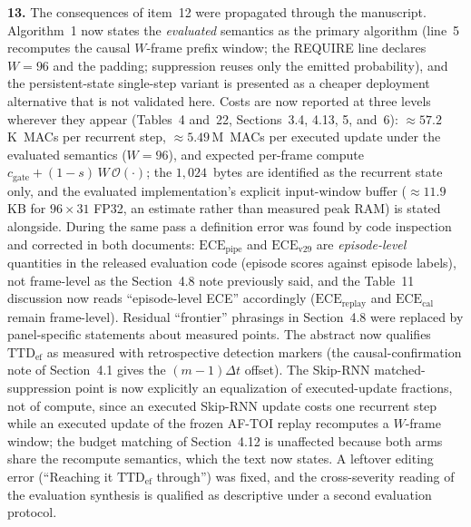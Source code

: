 \documentclass[1p,12pt,authoryear]{elsarticle}
\begin{document}
\vspace{2mm}
\noindent \textbf{13.} The consequences of item~12 were propagated through the manuscript. Algorithm~1 now states the \emph{evaluated} semantics as the primary algorithm (line~5 recomputes the causal $W$-frame prefix window; the REQUIRE line declares $W{=}96$ and the padding; suppression reuses only the emitted probability), and the persistent-state single-step variant is presented as a cheaper deployment alternative that is not validated here. Costs are now reported at three levels wherever they appear (Tables~4 and~22, Sections~3.4, 4.13, 5, and~6): ${\approx}57.2$\,K~MACs per recurrent step, ${\approx}5.49$\,M~MACs per executed update under the evaluated semantics ($W{=}96$), and expected per-frame compute $c_{\mathrm{gate}}+(1-s)\,W\,\mathcal{O}(\cdot)$; the $1{,}024$~bytes are identified as the recurrent state only, and the evaluated implementation's explicit input-window buffer (${\approx}11.9$\,KB for $96\times31$ FP32, an estimate rather than measured peak RAM) is stated alongside. During the same pass a definition error was found by code inspection and corrected in both documents: $\mathrm{ECE}_{\mathrm{pipe}}$ and $\mathrm{ECE}_{\mathrm{v29}}$ are \emph{episode-level} quantities in the released evaluation code (episode scores against episode labels), not frame-level as the Section~4.8 note previously said, and the Table~11 discussion now reads ``episode-level ECE'' accordingly ($\mathrm{ECE}_{\mathrm{replay}}$ and $\mathrm{ECE}_{\mathrm{cal}}$ remain frame-level). Residual ``frontier'' phrasings in Section~4.8 were replaced by panel-specific statements about measured points. The abstract now qualifies $\mathrm{TTD}_{\mathrm{ef}}$ as measured with retrospective detection markers (the causal-confirmation note of Section~4.1 gives the $(m{-}1)\Delta t$ offset). The Skip-RNN matched-suppression point is now explicitly an equalization of executed-update fractions, not of compute, since an executed Skip-RNN update costs one recurrent step while an executed update of the frozen AF-TOI replay recomputes a $W$-frame window; the budget matching of Section~4.12 is unaffected because both arms share the recompute semantics, which the text now states. A leftover editing error (``Reaching it $\mathrm{TTD}_{\mathrm{ef}}$ through'') was fixed, and the cross-severity reading of the evaluation synthesis is qualified as descriptive under a second evaluation protocol.
\end{document}
